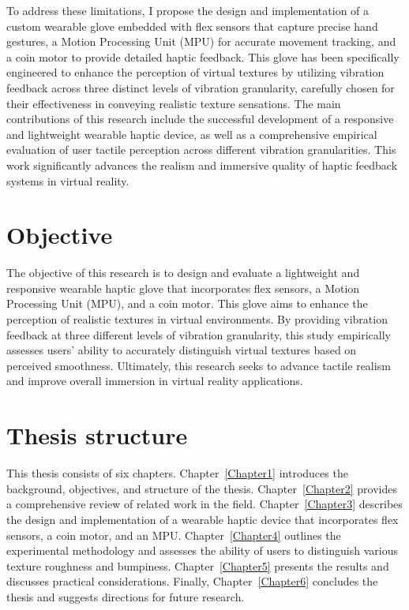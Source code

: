 To address these limitations, I propose the design and implementation of a custom wearable glove embedded with flex sensors that capture precise hand gestures, a Motion Processing Unit (MPU) for accurate movement tracking, and a coin motor to provide detailed haptic feedback. This glove has been specifically engineered to enhance the perception of virtual textures by utilizing vibration feedback across three distinct levels of vibration granularity, carefully chosen for their effectiveness in conveying realistic texture sensations\cite{10.1145/3025453.3025812}. The main contributions of this research include the successful development of a responsive and lightweight wearable haptic device, as well as a comprehensive empirical evaluation of user tactile perception across different vibration granularities. This work significantly advances the realism and immersive quality of haptic feedback systems in virtual reality.


\section{Objective}

The objective of this research is to design and evaluate a lightweight and responsive wearable haptic glove that incorporates flex sensors, a Motion Processing Unit (MPU), and a coin motor. This glove aims to enhance the perception of realistic textures in virtual environments. By providing vibration feedback at three different levels of vibration granularity, this study empirically assesses users' ability to accurately distinguish virtual textures based on perceived smoothness. Ultimately, this research seeks to advance tactile realism and improve overall immersion in virtual reality applications.

\section{Thesis structure}

This thesis consists of six chapters. Chapter~\ref{Chapter1} introduces the background, objectives, and structure of the thesis. Chapter~\ref{Chapter2} provides a comprehensive review of related work in the field. Chapter~\ref{Chapter3} describes the design and implementation of a wearable haptic device that incorporates flex sensors, a coin motor, and an MPU. Chapter~\ref{Chapter4} outlines the experimental methodology and assesses the ability of users to distinguish various texture roughness and bumpiness. Chapter~\ref{Chapter5} presents the results and discusses practical considerations. Finally, Chapter~\ref{Chapter6} concludes the thesis and suggests directions for future research.




